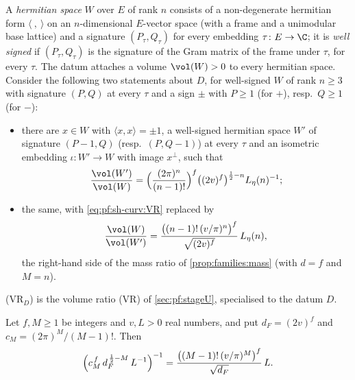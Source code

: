 \begin{definition}\label{pf:sh-curv:vrmr}
A \emph{hermitian space} $W$ over $E$ of rank $n$ consists of a non-degenerate hermitian form $\langle\ ,\ \rangle$ on an
$n$-dimensional $E$-vector space (with a frame and a unimodular base lattice) and a signature $(P_\tau,Q_\tau)$ for every
embedding $\tau\colon E\to\C$; it is \emph{well signed} if $(P_\tau,Q_\tau)$ is the signature of the Gram matrix of the
frame under $\tau$, for every $\tau$. The datum attaches a volume $\vol(W)>0$ to every hermitian space. Consider the
following two statements about $D$, for well-signed $W$ of rank $n\ge3$ with signature $(P,Q)$ at every $\tau$ and a sign
$\pm$ with $P\ge1$ (for $+$), resp.\ $Q\ge1$ (for $-$):
\begin{itemize}
\item[(VR$_D$)] there are $x\in W$ with $\langle x,x\rangle=\pm1$, a well-signed hermitian space $W'$ of signature
$(P-1,Q)$ (resp.\ $(P,Q-1)$) at every $\tau$ and an isometric embedding $\iota\colon W'\to W$ with image $x^\perp$, such
that
\begin{equation}\label{eq:pf:sh-curv:VR}
\frac{\vol(W')}{\vol(W)}=\Bigl(\frac{(2\pi)^n}{(n-1)!}\Bigr)^f\bigl((2v)^f\bigr)^{\frac12-n}L_\eta(n)^{-1};
\end{equation}
\item[(MR$_D$)] the same, with \eqref{eq:pf:sh-curv:VR} replaced by
\begin{equation}\label{eq:pf:sh-curv:MR}
\frac{\vol(W)}{\vol(W')}=\frac{\bigl((n-1)!\,(v/\pi)^n\bigr)^f}{\sqrt{(2v)^f}}\,L_\eta(n),
\end{equation}
the right-hand side of the mass ratio of \cref{prop:families:mass} (with $d=f$ and $M=n$).
\end{itemize}
\end{definition}

(VR$_D$) is the volume ratio (VR) of \cref{sec:pf:stageU}, specialised to the datum $D$.

\begin{lemma}\label{pf:sh-curv:gai}
Let $f,M\ge1$ be integers and $v,L>0$ real numbers, and put $d_F=(2v)^f$ and $c_M=(2\pi)^M/(M-1)!$. Then
\[
\Bigl(c_M^{\,f}\,d_F^{\,\frac12-M}\,L^{-1}\Bigr)^{-1}=\frac{\bigl((M-1)!\,(v/\pi)^M\bigr)^f}{\sqrt{d_F}}\,L .
\]
\end{lemma}

